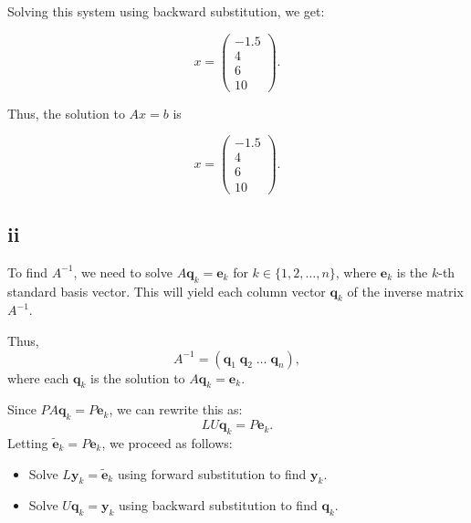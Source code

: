 \documentclass{article}
\begin{document}
Solving this system using backward substitution, we get:

\[
    x = \begin{pmatrix}
        -1.5 \\
        4    \\
        6    \\
        10
    \end{pmatrix}.
\]

Thus, the solution to \(Ax = b\) is

\[
    x = \begin{pmatrix}
        -1.5 \\
        4    \\
        6    \\
        10
    \end{pmatrix}.
\]

\subsection*{ii}


To find \( A^{-1} \), we need to solve \( A \mathbf{q}_k = \mathbf{e}_k \) for \( k \in \{1, 2, \ldots, n\} \), where \( \mathbf{e}_k \) is the \( k \)-th standard basis vector. This will yield each column vector \( \mathbf{q}_k \) of the inverse matrix \( A^{-1} \).

Thus,
\[
    A^{-1} = \left( \mathbf{q}_1 \; \mathbf{q}_2 \; \dots \; \mathbf{q}_n \right),
\]
where each \( \mathbf{q}_k \) is the solution to \( A \mathbf{q}_k = \mathbf{e}_k \).

Since \( PA \mathbf{q}_k = P \mathbf{e}_k \), we can rewrite this as:
\[
    LU \mathbf{q}_k = P \mathbf{e}_k.
\]
Letting \( \tilde{\mathbf{e}}_k = P \mathbf{e}_k \), we proceed as follows:

\begin{itemize}
    \item Solve \( L \mathbf{y}_k = \tilde{\mathbf{e}}_k \) using forward substitution to find \( \mathbf{y}_k \).
    \item Solve \( U \mathbf{q}_k = \mathbf{y}_k \) using backward substitution to find \( \mathbf{q}_k \).
\end{itemize}
\end{document}

